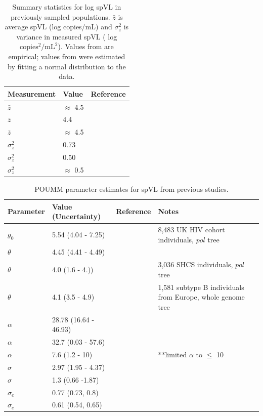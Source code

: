 \documentclass[11pt]{article}
\begin{document}
\begin{table}[H]
\caption{Summary statistics for log spVL in previously sampled populations. $\bar{z}$ is average spVL (log copies/mL) and $\sigma^2_z$ is variance in measured spVL ( log $\textrm{copies}^2/\textrm{mL}^2$). Values from \protect\citep{Blanquart2017, Mitov2018} are empirical; values from \protect\citep{Bonhoeffer2015} were estimated by fitting a normal distribution to the data.}
	\begin{tabularx}{\linewidth}{XXX} \hline 
	Measurement & Value & Reference \\ \hline 
	$\bar{z}$ & $\approx$ 4.5 & \citet{Mitov2018} \\
	$\bar{z}$ &  4.4 & \citet{Blanquart2017} \\
	$\bar{z}$ & $\approx$ 4.5 & \citet{Bonhoeffer2015} \\
	$\sigma^2_z$ &  0.73 &  \citet{Mitov2018} \\
	$\sigma^2_z$ &  0.50 & \citet{Blanquart2017} \\
	$\sigma^2_z$ & $\approx$ 0.5 & \citet{Bonhoeffer2015} \\ \hline 
	\end{tabularx}
	\label{tab:spVLmeasurements}
\end{table}

\begin{table}[H]
\caption{POUMM parameter estimates for spVL from previous studies.}
	\begin{tabularx}{\linewidth}{llXXX}
	\hline 
	Parameter & Value (Uncertainty) & Reference & Notes \\
	\hline 
	$g_0$ & 5.54 (4.04 - 7.25) & \citet{Mitov2018} & 8,483 UK HIV cohort individuals, $pol$ tree \\
	$\theta$ & 4.45 (4.41 - 4.49) & \citet{Mitov2018} & \\
	$\theta$ &  4.0 (1.6 - 4.)) & \citet{Bertels2018} & 3,036 SHCS individuals, $pol$ tree \\
	$\theta$ & 4.1 (3.5 - 4.9) & \citet{Blanquart2017} & 1,581 subtype B individuals from Europe, whole genome tree \\
	$\alpha$ & 28.78 (16.64 - 46.93) & \citet{Mitov2018} & \\
	$\alpha$ & 32.7 (0.03 - 57.6) & \citet{Bertels2018} & \\
	$\alpha$ & 7.6 (1.2 - 10) & \citet{Blanquart2017} & **limited $\alpha$ to $\le$ 10 \\
	$\sigma$ & 2.97 (1.95 - 4.37) & \citet{Mitov2018} & \\
	$\sigma$ & 1.3 (0.66 -1.87) &  \citet{Blanquart2017} & \\
	$\sigma_e$ & 0.77 (0.73, 0.8) & \citet{Mitov2018} & \\
	$\sigma_e$ & 0.61 (0.54, 0.65) &  \citet{Blanquart2017} & \\
	\hline 
	\end{tabularx}
	\label{tab:POUMMparams-prev-estimated}
\end{table}
\end{document}
